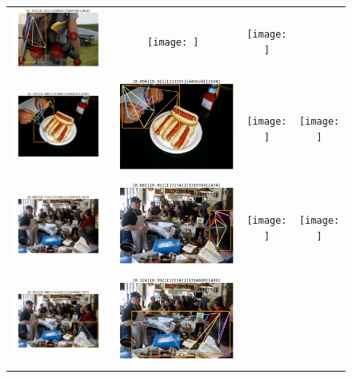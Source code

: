 \documentclass[10pt,onecolumn,letterpaper]{article}
\begin{document}
\begin{figure}[h!]
{\begin{tabular}{cc|cc}
\includegraphics[width=.2\linewidth,height=.15\paperwidth,keepaspectratio]{./result/rmpe/scoring_errors/score_err_2_high_oks.pdf} &
\texttt{[image: ]} &
\texttt{[image: ]}\\
\includegraphics[width=.2\linewidth,height=.15\paperwidth,keepaspectratio]{./result/rmpe/scoring_errors/score_err_3_high_score.pdf} &
\includegraphics[width=.2\linewidth,height=.15\paperwidth,keepaspectratio]{./result/rmpe/scoring_errors/score_err_3_high_oks.pdf} &
\texttt{[image: ]} &
\texttt{[image: ]}\\
\includegraphics[width=.2\linewidth,height=.15\paperwidth,keepaspectratio]{./result/rmpe/scoring_errors/score_err_4_high_score.pdf} &
\includegraphics[width=.2\linewidth,height=.15\paperwidth,keepaspectratio]{./result/rmpe/scoring_errors/score_err_4_high_oks.pdf} &
\texttt{[image: ]} &
\texttt{[image: ]}\\
\includegraphics[width=.2\linewidth,height=.15\paperwidth,keepaspectratio]{./result/rmpe/scoring_errors/score_err_5_high_score.pdf} &
\includegraphics[width=.2\linewidth,height=.15\paperwidth,keepaspectratio]{./result/rmpe/scoring_errors/score_err_5_high_oks.pdf} &

\end{tabular}}
\end{figure}
\end{document}
